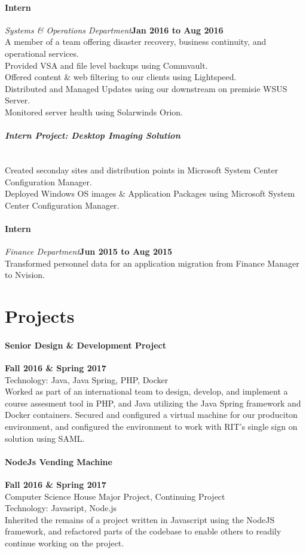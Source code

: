 \documentclass[10pt]{article}
\begin{document}
\paragraph{\bf Intern}{\it Systems \& Operations Department}\hfill{\bf Jan 2016 to Aug 2016}\\
A member of a team offering disaster recovery, business continuity, and operational services.\\
Provided VSA and file level backups using Commvault.\\
Offered content \& web filtering to our clients using Lightspeed.\\
Distributed and Managed Updates using our downstream on premisie WSUS Server.\\
Monitored server health using Solarwinds Orion.
\paragraph{\it {\normalfont Intern Project: Desktop Imaging Solution}}~\\
Created seconday sites and distribution points in Microsoft System Center Configuration Manager.\\
Deployed Windows OS images \& Application Packages using Microsoft System Center Configuration Manager.
\paragraph{\bf Intern}{\it Finance Department}\hfill{\bf Jun 2015 to Aug 2015}\\
Transformed personnel data for an application migration from Finance Manager to Nvision.
\section*{\large Projects}
\paragraph{\bf Senior Design \& Development Project}\hfill{\bf Fall 2016 \& Spring 2017}\\
Technology: Java, Java Spring, PHP, Docker\\
Worked as part of an international team to design, develop, and implement a course assesment tool in PHP, and Java utilizing the Java Spring framework and Docker containers. Secured and configured a virtual machine for our produciton environment, and configured the environment to work with RIT's single sign on solution using SAML.
\paragraph{\bf NodeJs Vending Machine}\hfill{\bf Fall 2016 \& Spring 2017}\\
Computer Science House Major Project, Continuing Project\\
Technology: Javasript, Node.js\\
Inherited the remains of a project written in Javascript using the NodeJS framework, and refactored parts of the codebase to enable others to readily continue working on the project.
\end{document}
